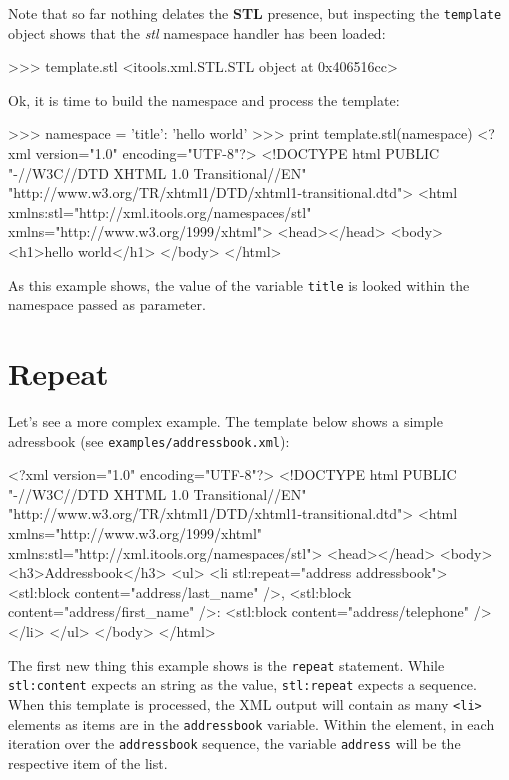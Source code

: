 Note that so far nothing delates the {\bf STL} presence, but inspecting
the {\tt template} object shows that the {\em stl} namespace handler has
been loaded:

\begin{code}
    >>> template.stl
    <itools.xml.STL.STL object at 0x406516cc>
\end{code}

Ok, it is time to build the namespace and process the template:

\begin{code}
    >>> namespace = {'title': 'hello world'}
    >>> print template.stl(namespace)
    <?xml version="1.0" encoding="UTF-8"?>
    <!DOCTYPE html
         PUBLIC "-//W3C//DTD XHTML 1.0 Transitional//EN"
        "http://www.w3.org/TR/xhtml1/DTD/xhtml1-transitional.dtd">
    <html xmlns:stl="http://xml.itools.org/namespaces/stl"
          xmlns="http://www.w3.org/1999/xhtml">
      <head></head>
      <body>
        <h1>hello world</h1>
      </body>
    </html>
\end{code}


As this example shows, the value of the variable {\tt title} is looked within
the namespace passed as parameter.


\section{Repeat}

Let's see a more complex example. The template below shows a simple
adressbook (see {\tt examples/addressbook.xml}):

\begin{code}
    <?xml version="1.0" encoding="UTF-8"?>
    <!DOCTYPE html
         PUBLIC "-//W3C//DTD XHTML 1.0 Transitional//EN"
         "http://www.w3.org/TR/xhtml1/DTD/xhtml1-transitional.dtd">
    <html xmlns="http://www.w3.org/1999/xhtml"
          xmlns:stl="http://xml.itools.org/namespaces/stl">
      <head></head>
      <body>
        <h3>Addressbook</h3>
        <ul>
          <li stl:repeat="address addressbook">
            <stl:block content="address/last_name" />,
            <stl:block content="address/first_name" />:
            <stl:block content="address/telephone" />
          </li>
        </ul>
      </body>
    </html>
\end{code}

The first new thing this example shows is the {\tt repeat} statement. While
{\tt stl:content} expects an string as the value, {\tt stl:repeat} expects
a sequence. When this template is processed, the XML output will contain as
many {\tt <li>} elements as items are in the {\tt addressbook} variable.
Within the element, in each iteration over the {\tt addressbook} sequence,
the variable {\tt address} will be the respective item of the list.

